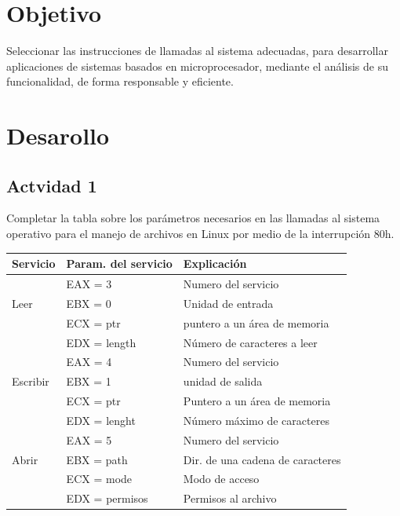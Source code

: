 \documentclass[12pt]{article}
\begin{document}
\section*{Objetivo}
\label{sec:orgc2f40cb}
Seleccionar las instrucciones de llamadas al sistema adecuadas, para 
desarrollar aplicaciones de sistemas basados en microprocesador, 
mediante el análisis de su funcionalidad, de forma responsable y eficiente.

\section*{Desarollo}
\label{sec:org566af73}
\subsection*{Actvidad 1}
\label{sec:org62f16ce}
Completar la tabla sobre los parámetros necesarios en las llamadas al
sistema operativo para el manejo de archivos en Linux por medio de la 
interrupción 80h.

\begin{center}
\begin{tabular}{|l|l|l|}
\hline
Servicio & Param. del servicio & Explicación\\
\hline
 & EAX = 3 & Numero del servicio\footnotemark\\
Leer & EBX = 0 & Unidad de entrada\footnotemark\\
 & ECX = ptr & puntero a un área de memoria\\
 & EDX = length & Número de caracteres a leer\\
\hline
 & EAX = 4 & Numero del servicio\\
Escribir & EBX = 1 & unidad de salida\footnotemark\\
 & ECX = ptr & Puntero a un área de memoria\\
 & EDX = lenght & Número máximo de caracteres\\
\hline
 & EAX = 5 & Numero del servicio\\
Abrir & EBX = path & Dir. de una cadena de caracteres\\
 & ECX = mode & Modo de acceso\footnotemark\\
 & EDX = permisos & Permisos al archivo\\
\hline
\end{tabular}
\end{center}
\end{document}
